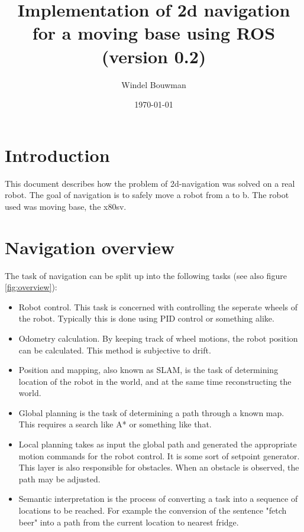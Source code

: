 \documentclass[a4paper]{article}
\begin{document}
\title{Implementation of 2d navigation for a moving base using ROS
(version 0.2)
}
\date{\today}
\author{Windel Bouwman}

\maketitle

\tableofcontents

\section{Introduction}

This document describes how the problem of 2d-navigation was solved on a real robot.
The goal of navigation is to safely move a robot from a to b. The robot used
was moving base, the x80sv.

\section{Navigation overview}

The task of navigation can be split up into the following tasks (see also figure \ref{fig:overview}):

\begin{itemize}
  \item Robot control. This task is concerned with controlling the seperate wheels of the robot. Typically this is done using PID control or something alike.
  \item Odometry calculation. By keeping track of wheel motions, the robot position can be
calculated. This method is subjective to drift.
  \item Position and mapping, also known as SLAM, is the task of determining location of the robot in the world, and at the same time reconstructing the world.
  \item Global planning is the task of determining a path through a known map. This requires a search like A* or something like that.
  \item Local planning takes as input the global path and generated the appropriate motion commands for the robot control. It is some sort of setpoint generator. This layer is also responsible for obstacles. When an obstacle is observed, the path may be adjusted.
  \item Semantic interpretation is the process of converting a task into a sequence of locations to be reached. For example the conversion of the sentence "fetch beer" into a path from the current location to nearest fridge.
\end{itemize}
\end{document}
